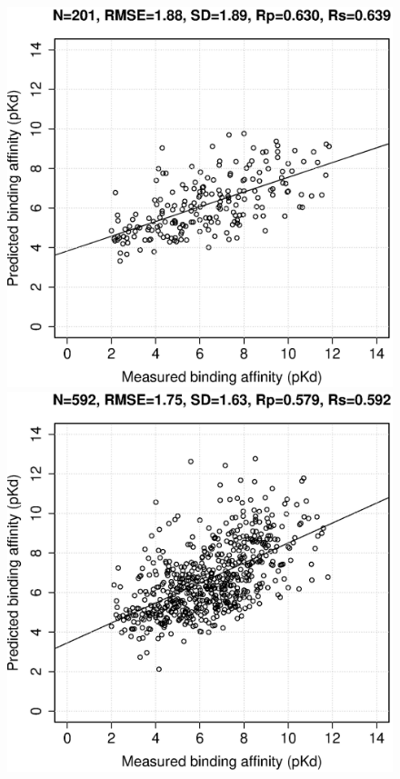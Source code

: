 \documentclass[journal=jacsat,manuscript=article]{achemso}
\begin{document}
\begin{figure}[ht!]
\includegraphics[width=\linewidth]{../rfcyscore/x4/mlr/trn-247-tst-201-yp.eps}
\endminipage
{}
\includegraphics[width=\linewidth]{../rfcyscore/x4/mlr/trn-247-tst-592-yp.eps}
\endminipage

\end{figure}
\end{document}

